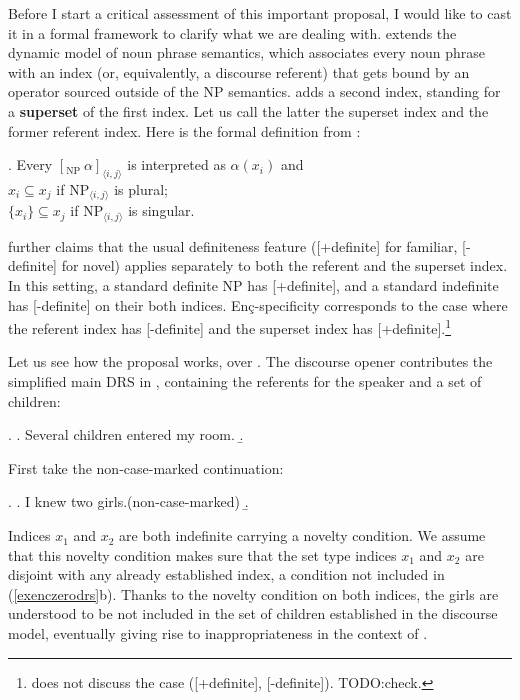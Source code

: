 \documentclass[11pt,a4paper]{article}
\newcommand{\encspec}{Enç-specific}
\begin{document}
Before I start a critical assessment of this important proposal, I
would like to cast it in a formal framework to clarify what we are
dealing with.  extends the dynamic model of noun phrase
semantics, which associates every noun phrase with an index (or,
equivalently, a discourse referent) that gets bound by an operator
sourced outside of the NP semantics.   adds a second
index, standing for a \textbf{superset} of the first index. Let us
call the latter the superset index and the former referent index.
Here is the formal definition from :

\ex.\label{encform} Every $[_{\text{NP}}\  \alpha ]_{\langle i,j\rangle}$ is interpreted as
$\alpha(x_i)$ and\\
$x_i \subseteq x_j$ if $\text{NP}_{\langle i,j\rangle}$ is plural;\\
$\{x_i\} \subseteq x_j$ if $\text{NP}_{\langle i,j\rangle}$ is
singular.

 further claims that the usual definiteness feature ([+definite]
for familiar, [-definite] for novel) applies separately to both the referent
and the superset index. In this setting, a standard definite NP has
[+definite], and a standard indefinite has [-definite] on their both indices.
\encspec ity corresponds to the case where the referent index has [-definite]
and the superset index has [+definite].\footnote{ does not discuss
the case ([+definite], [-definite]). TODO:check.}

Let us see how the proposal works, over . The discourse opener
 contributes the simplified main DRS in ,
containing the referents for the speaker and a set of children:

\ex.\label{exencmaindrs}
\a. Several children entered my room.
\b. 

First take the non-case-marked continuation:

\ex.\label{exenczerodrs}
\a. I knew two girls.\hfill (non-case-marked)
\b.

Indices $x_1$ and $x_2$ are both indefinite carrying a novelty condition. We
assume that this novelty condition makes sure that the set type indices $x_1$
and $x_2$ are disjoint with any already established index, a condition not
included in (\ref{exenczerodrs}b).  Thanks to the novelty condition on both
indices, the girls are understood to be not included in the set of children
established in the discourse model, eventually giving rise to inappropriateness
in the context of .
\end{document}
